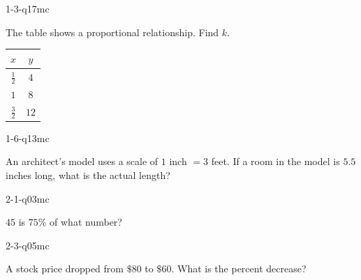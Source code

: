 
\begin{practiceQuestion}{1-3-q17}{mc}
\begin{questionText}
The table shows a proportional relationship. Find $k$.

\begin{center}
\begin{tabular}{|c|c|}
\hline $x$ & $y$ \\ \hline $\frac{1}{2}$ & $4$ \\ $1$ & $8$ \\ $\frac{3}{2}$ & $12$ \\ \hline
\end{tabular}
\end{center}
\end{questionText}
\end{practiceQuestion}

\begin{practiceQuestion}{1-6-q13}{mc}
\begin{questionText}
An architect's model uses a scale of $1$ inch $= 3$ feet. If a room in the model is $5.5$ inches long, what is the actual length?
\end{questionText}
\end{practiceQuestion}

\begin{practiceQuestion}{2-1-q03}{mc}
\begin{questionText}
$45$ is $75\%$ of what number?
\end{questionText}
\end{practiceQuestion}

\begin{practiceQuestion}{2-3-q05}{mc}
\begin{questionText}
A stock price dropped from $\$80$ to $\$60$. What is the percent decrease?


\end{questionText}
\end{practiceQuestion}

